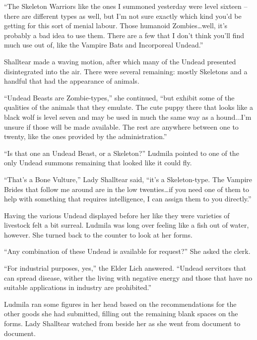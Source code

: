  

“The Skeleton Warriors like the ones I summoned yesterday were level sixteen – there are different types as well, but I’m not sure exactly which kind you’d be getting for this sort of menial labour. Those humanoid Zombies…well, it’s probably a bad idea to use them. There are a few that I don’t think you’ll find much use out of, like the Vampire Bats and Incorporeal Undead.”

 

Shalltear made a waving motion, after which many of the Undead presented disintegrated into the air. There were several remaining: mostly Skeletons and a handful that had the appearance of animals.

 

“Undead Beasts are Zombie-types,” she continued, “but exhibit some of the qualities of the animals that they emulate. The cute puppy there that looks like a black wolf is level seven and may be used in much the same way as a hound...I’m unsure if those will be made available. The rest are anywhere between one to twenty, like the ones provided by the administration.”

 

“Is that one an Undead Beast, or a Skeleton?” Ludmila pointed to one of the only Undead summons remaining that looked like it could fly.

 

“That’s a Bone Vulture,” Lady Shalltear said, “it’s a Skeleton-type. The Vampire Brides that follow me around are in the low twenties…if you need one of them to help with something that requires intelligence, I can assign them to you directly.”

 

Having the various Undead displayed before her like they were varieties of livestock felt a bit surreal. Ludmila was long over feeling like a fish out of water, however. She turned back to the counter to look at her forms.

 

“Any combination of these Undead is available for request?” She asked the clerk.

 

“For industrial purposes, yes,” the Elder Lich answered. “Undead servitors that can spread disease, wither the living with negative energy and those that have no suitable applications in industry are prohibited.”

 

Ludmila ran some figures in her head based on the recommendations for the other goods she had submitted, filling out the remaining blank spaces on the forms. Lady Shalltear watched from beside her as she went from document to document.

